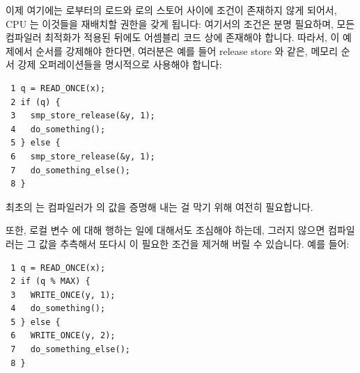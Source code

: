 이제 여기에는  로부터의 로드와  로의 스토어 사이에 조건이 존재하지
않게 되어서, CPU 는 이것들을 재배치할 권한을 갖게 됩니다:
여기서의 조건은 분명 필요하며, 모든 컴파일러 최적화가 적용된 뒤에도 어셈블리
코드 상에 존재해야 합니다.
따라서, 이 예제에서 순서를 강제해야 한다면, 여러분은 예를 들어 release store 와
같은, 메모리 순서 강제 오퍼레이션들을 명시적으로 사용해야 합니다:

\vspace{5pt}
\begin{minipage}[t]{\columnwidth}
\scriptsize
\begin{verbatim}
 1 q = READ_ONCE(x);
 2 if (q) {
 3   smp_store_release(&y, 1);
 4   do_something();
 5 } else {
 6   smp_store_release(&y, 1);
 7   do_something_else();
 8 }
\end{verbatim}
\end{minipage}
\vspace{5pt}

최초의  는 컴파일러가  의 값을 증명해 내는 걸 막기 위해
여전히 필요합니다.

또한, 로컬 변수  에 대해 행하는 일에 대해서도 조심해야 하는데, 그러지
않으면 컴파일러는 그 값을 추측해서 또다시 이 필요한 조건을 제거해 버릴 수
있습니다.
예를 들어:

\vspace{5pt}
\begin{minipage}[t]{\columnwidth}
\scriptsize
\begin{verbatim}
 1 q = READ_ONCE(x);
 2 if (q % MAX) {
 3   WRITE_ONCE(y, 1);
 4   do_something();
 5 } else {
 6   WRITE_ONCE(y, 2);
 7   do_something_else();
 8 }
\end{verbatim}
\end{minipage}
\vspace{5pt}

